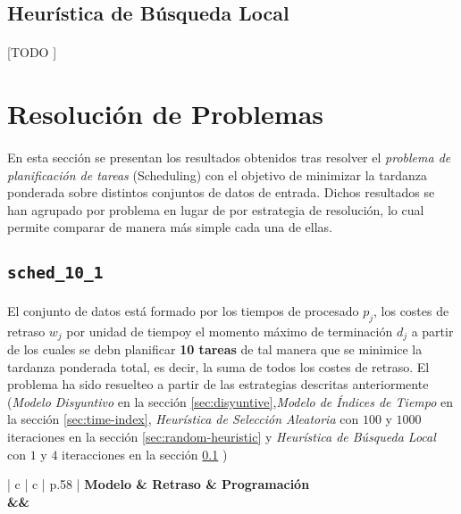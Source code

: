 \documentclass[spanish]{article}
\begin{document}
		\subsection{Heurística de Búsqueda Local}
		\label{sec:local-search-heuristic}

			\paragraph{}
			[TODO ]


	\section{Resolución de Problemas}
	\label{sec:problems}

		\paragraph{}
		En esta sección se presentan los resultados obtenidos tras resolver el \emph{problema de planificación de tareas} (Scheduling) con el objetivo de minimizar la tardanza ponderada sobre distintos conjuntos de datos de entrada. Dichos resultados se han agrupado por problema en lugar de por estrategia de resolución, lo cual permite comparar de manera más simple cada una de ellas.

		\subsection{\texttt{sched\_10\_1}}

			\paragraph{}
			El conjunto de datos está formado por los tiempos de procesado $p_j$, los costes de retraso $w_j$ por unidad de tiempoy el momento máximo de terminación $d_j$ a partir de los cuales se debn planificar \textbf{10 tareas} de tal manera que se minimice la tardanza ponderada total, es decir, la suma de todos los costes de retraso. El problema ha sido resuelteo a partir de las estrategias descritas anteriormente (\emph{Modelo Disyuntivo} en la sección \ref{sec:disyuntive},\emph{Modelo de Índices de Tiempo} en la sección \ref{sec:time-index}, \emph{Heurística de Selección Aleatoria} con $100$ y $1000$ iteraciones en la sección \ref{sec:random-heuristic} y \emph{Heurística de Búsqueda Local} con $1$ y $4$ iteracciones en la sección \ref{sec:local-search-heuristic} )

			\begin{table}[h]
				\centering
				\begin{tabu}{ | c | c | p{.58\linewidth} |}
					\hline
					\bfseries Modelo & \bfseries Retraso & \bfseries Programación
					{\\\hline\model&\delay&\schedule}
					\\\hline
				\end{tabu}
				\caption{Resultados Obtenidos para el problema \texttt{sched\_10\_1}}
				\label{table:sol-sched_10_1}
			\end{table}
\end{document}
